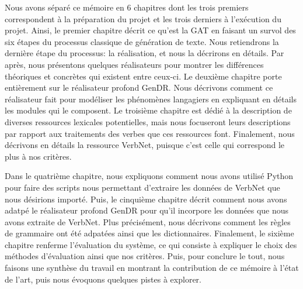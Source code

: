 Nous avons séparé ce mémoire en 6 chapitres dont les trois premiers correspondent à la préparation du projet et les trois derniers à l'exécution du projet. Ainsi, le premier chapitre décrit ce qu'est la \ac{GAT} en faisant un survol des six étapes du processus classique de génération de texte. Nous retiendrons la dernière étape du processus: la réalisation, et nous la décrirons en détails. Par après, nous présentons quelques réalisateurs pour montrer les différences théoriques et concrètes qui existent entre ceux-ci. Le deuxième chapitre porte entièrement sur le réalisateur profond GenDR. Nous décrivons comment ce réalisateur fait pour modéliser les phénomènes langagiers en expliquant en détails les modules qui le composent. Le troisième chapitre est dédié à la description de diverses ressources lexicales potentielles, mais nous focuseront leurs descriptions par rapport aux traitements des verbes que ces ressources font. Finalement, nous décrivons en détails la ressource VerbNet, puisque c'est celle qui correspond le plus à nos critères.

Dans le quatrième chapitre, nous expliquons comment nous avons utilisé Python pour faire des scripts nous permettant d'extraire les données de VerbNet que nous désirions importé. Puis, le cinquième chapitre décrit comment nous avons adatpé le réalisateur profond GenDR pour qu'il incorpore les données que nous avons extraite de VerbNet. Plus précisément, nous décrivons comment les règles de grammaire ont été adpatées ainsi que les dictionnaires. Finalement, le sixième chapitre renferme l'évaluation du système, ce qui consiste à expliquer le choix des méthodes d'évaluation ainsi que nos critères. Puis, pour conclure le tout, nous faisons une synthèse du travail en montrant la contribution de ce mémoire à l'état de l'art, puis nous évoquons quelques pistes à explorer.

